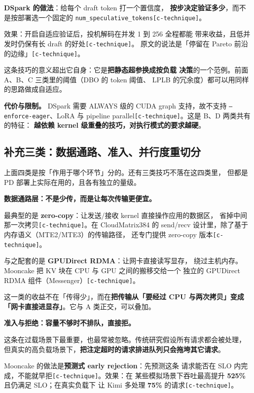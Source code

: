 \noindent\textbf{DSpark 的做法}：给每个 draft token 打一个置信度，
\textbf{按步决定验证多少}，而不是按部署选一个固定的
\texttt{num\_speculative\_tokens}\texttt{[c-technique]}。

\noindent 效果：开启自适应验证后，投机解码在并发 1 到 256 全程都能
带来收益，且低并发时仍保有长 draft 的好处\texttt{[c-technique]}。
原文的说法是「停留在 Pareto 前沿的边缘」\texttt{[c-technique]}。

\noindent 这条技巧的意义超出它自身：它是\textbf{把静态超参换成按负载
决策}的一个范例。前面 A、B、C 三类里的阈值（DBO 的 token 阈值、
LPLB 的冗余度）都可以用同样的思路做成自适应。

\noindent\textbf{代价与限制。} DSpark 需要 ALWAYS 级的 CUDA graph
支持，故不支持 \texttt{--enforce-eager}、LoRA 与 pipeline
parallel\texttt{[c-technique]}。这是 B、D 两类共有的特征：
\textbf{越依赖 kernel 级重叠的技巧，对执行模式的要求越硬}。

\subsection{补充三类：数据通路、准入、并行度重切分}

上面四类是按「作用于哪个环节」分的。还有三类技巧不落在这四类里，
但都是 PD 部署上实际在用的，且各有独立的量级。

\noindent\textbf{ 数据通路层：不是少传，而是让每次传输更便宜。}

最典型的是 \textbf{zero-copy}：让发送/接收 kernel 直接操作应用的数据区，
省掉中间那一次拷贝\texttt{[c-technique]}。在 CloudMatrix384 的
send/recv 设计里，除了基于内存语义（MTE2/MTE3）的传输路径，
还专门提供 zero-copy 版本\texttt{[c-technique]}。

\noindent 与之配套的是 \textbf{GPUDirect RDMA}：让网卡直接读写显存，
绕过主机内存。Mooncake 把 KV 块在 CPU 与 GPU 之间的搬移交给一个
独立的 GPUDirect RDMA 组件（Messenger）\texttt{[c-technique]}。

\noindent 这一类的收益不在「传得少」，而在\textbf{把传输从「要经过
CPU 与两次拷贝」变成「网卡直接进显存」}。它与 A 类正交，可以叠加。

\noindent\textbf{ 准入与拒绝：容量不够时不排队，直接拒。}

这条在过载场景下最重要，也最常被忽略。传统研究假设所有请求都会被处理，
但真实的高负载场景下，\textbf{把注定超时的请求排进队列只会拖垮其它请求}。

\noindent Mooncake 的做法是\textbf{预测式 early rejection}：先预测这条
请求能否在 SLO 内完成，不能就早拒\texttt{[c-technique]}。效果：在
某些模拟场景下吞吐最高提升 \textbf{525\%} 且仍满足 SLO；在真实负载下
让 Kimi 多处理 \textbf{75\%} 的请求\texttt{[c-technique]}。

